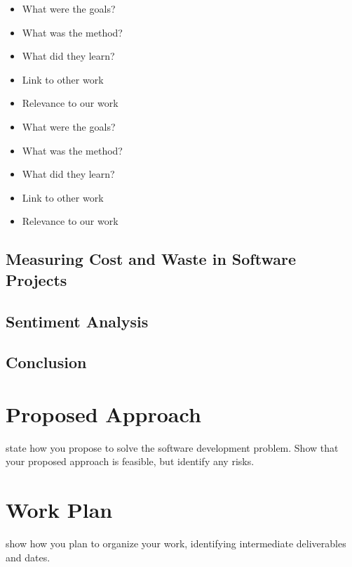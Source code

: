 \documentclass{mprop}
\begin{document}
\citep{aranda2009secret}
\begin{itemize}
\item What were the goals?
\item What was the method?
\item What did they learn?
\item Link to other work
\item Relevance to our work
\end{itemize}

\citep{aranda2009secret}
\begin{itemize}
\item What were the goals?
\item What was the method?
\item What did they learn?
\item Link to other work
\item Relevance to our work
\end{itemize}

\subsection{Measuring Cost and Waste in Software Projects}

\subsection{Sentiment Analysis}

\subsection{Conclusion}

\section{Proposed Approach}

state how you propose to solve the software development problem. Show that your proposed approach is feasible, but identify any risks.

\section{Work Plan}

show how you plan to organize your work, identifying intermediate deliverables and dates.



\end{document}
